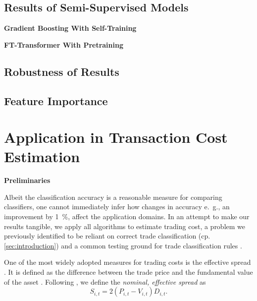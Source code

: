
\subsection{Results of Semi-Supervised
    Models}\label{sec:results-of-semi-supervised-models}

\textbf{Gradient Boosting With Self-Training}

\textbf{FT-Transformer With Pretraining}

\subsection{Robustness of Results}\label{sec:robustness-checks}

\subsection{Feature Importance}\label{sec:feature-importance}

\newpage
\section{Application in Transaction Cost Estimation}\label{sec:application}

\textbf{Preliminaries}


Albeit the classification accuracy is a reasonable measure for comparing classifiers, one cannot immediately infer how changes in accuracy e.~g., an improvement by \SI{1}{\percent}, affect the application domains. In an attempt to make our results tangible, we apply all algorithms to estimate trading cost, a problem we previously identified to be reliant on correct trade classification (cp. \cref{sec:introduction}) and a common testing ground for trade classification rules \autocites[cp.][541]{ellisAccuracyTradeClassification2000}[][569]{finucaneDirectTestMethods2000}[][271--278]{petersonEvaluationBiasesExecution2003}[][896--897]{savickasInferringDirectionOption2003}.

One of the most widely adopted measures for trading costs is the effective spread \autocite[][112]{Piwowar_2006}. It is defined as the difference between the trade price and the fundamental value of the asset \autocite[][238--239]{bessembinderIssuesAssessingTrade2003}. Following \textcite[][238--239]{bessembinderIssuesAssessingTrade2003}, we define the \emph{nominal, effective spread} as
\begin{equation}
    S_{i,t} = 2 (P_{i,t} - V_{i,t}) D_{i,t}.
    \label{eq:effective-spread}
\end{equation}

